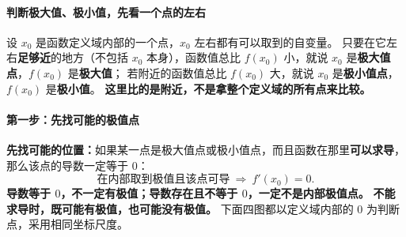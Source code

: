 \begin{statementbox}
	\paragraph{判断极大值、极小值，先看一个点的左右}
	\begin{center}\end{center}

	设 $x_0$ 是函数定义域内部的一个点，$x_0$ 左右都有可以取到的自变量。
	只要在它左右\textbf{足够近}的地方（不包括 $x_0$ 本身），函数值总比 $f(x_0)$ 小，就说 $x_0$ 是\textbf{极大值点}，$f(x_0)$ 是\textbf{极大值}；
	若附近的函数值总比 $f(x_0)$ 大，就说 $x_0$ 是\textbf{极小值点}，$f(x_0)$ 是\textbf{极小值}。
	\textbf{这里比的是附近，不是拿整个定义域的所有点来比较。}

	\end{statementbox}
\clearpage
\begin{statementbox}
\paragraph{第一步：先找可能的极值点}
	\textbf{先找可能的位置：}如果某一点是极大值点或极小值点，而且函数在那里\textbf{可以求导}，那么该点的导数一定等于 $0$：
	\[
		\boxed{\text{在内部取到极值且该点可导}\ \Longrightarrow\ f'(x_0)=0.}
	\]
\textbf{导数等于 $0$，不一定有极值；导数存在且不等于 $0$，一定不是内部极值点。}
\textbf{不能求导时，既可能有极值，也可能没有极值。}
下面四图都以定义域内部的 $0$ 为判断点，采用相同坐标尺度。
	\begin{center}\end{center}

\end{statementbox}
\clearpage
